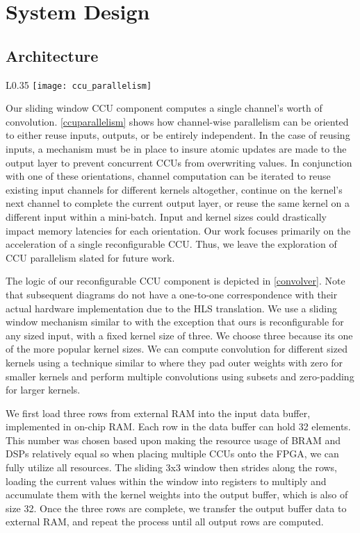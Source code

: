 \chapter{System Design}
\section{Architecture}

\begin{wrapfigure}{L}{0.35\textwidth}
	\texttt{[image: ccu\_parallelism]}
	\caption[CCU Channel-Wise Parallelism]%
	{\narrower Channel-wise convolution oriented to either reuse inputs, outputs, or stay independent.}
	\label{ccuparallelism}
\end{wrapfigure}

Our sliding window CCU component computes a single channel's worth of convolution. \ref{ccuparallelism} shows how channel-wise parallelism can be oriented to either reuse inputs, outputs, or be entirely independent. In the case of reusing inputs, a mechanism must be in place to insure atomic updates are made to the output layer to prevent concurrent CCUs from overwriting values. In conjunction with one of these orientations, channel computation can be iterated to reuse existing input channels for different kernels altogether, continue on the kernel's next channel to complete the current output layer, or reuse the same kernel on a different input within a mini-batch. Input and kernel sizes could drastically impact memory latencies for each orientation. Our work focuses primarily on the acceleration of a single reconfigurable CCU. Thus, we leave the exploration of CCU parallelism slated for future work.

The logic of our reconfigurable CCU component is depicted in \ref{convolver}. Note that subsequent diagrams do not have a one-to-one correspondence with their actual hardware implementation due to the HLS translation. We use a sliding window mechanism similar to \cite{liu2016automatic} with the exception that ours is reconfigurable for any sized input, with a fixed kernel size of three. We choose three because its one of the more popular kernel sizes. We can compute convolution for different sized kernels using a technique similar to \cite{guo2018angel} where they pad outer weights with zero for smaller kernels and perform multiple convolutions using subsets and zero-padding for larger kernels.

We first load three rows from external RAM into the input data buffer, implemented in on-chip RAM. Each row in the data buffer can hold 32 elements. This number was chosen based upon making the resource usage of BRAM and DSPs relatively equal so when placing multiple CCUs onto the FPGA, we can fully utilize all resources. The sliding 3x3 window then strides along the rows, loading the current values within the window into registers to multiply and accumulate them with the kernel weights into the output buffer, which is also of size 32. Once the three rows are complete, we transfer the output buffer data to external RAM, and repeat the process until all output rows are computed.



